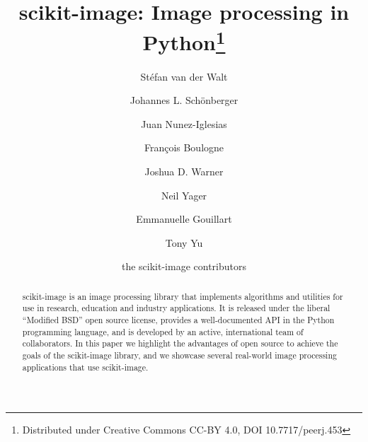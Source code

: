 \documentclass[fleqn,12pt]{wlpeerj}
\begin{document}
\title{scikit-image: Image processing in Python\footnote{Distributed under
Creative Commons CC-BY 4.0, DOI 10.7717/peerj.453}}

\author[1,2]{Stéfan van der Walt}
\author[3]{Johannes L. Schönberger}
\author[4]{Juan Nunez-Iglesias}
\author[5]{François Boulogne}
\author[6]{Joshua D. Warner}
\author[7]{Neil Yager}
\author[8]{Emmanuelle Gouillart}
\author[9]{Tony Yu}
\author[10]{the scikit-image contributors}



\begin{abstract}
    scikit-image is an image processing library that implements algorithms and utilities for use in research, education and industry applications. It is released under the liberal ``Modified BSD'' open source license, provides a well-documented API in the Python programming language, and is developed by an active, international team of collaborators. In this paper we highlight the advantages of open source to achieve the goals of the scikit-image library, and we showcase several real-world image processing applications that use scikit-image.
\end{abstract}

\flushbottom
\maketitle
\thispagestyle{empty}

\end{document}
